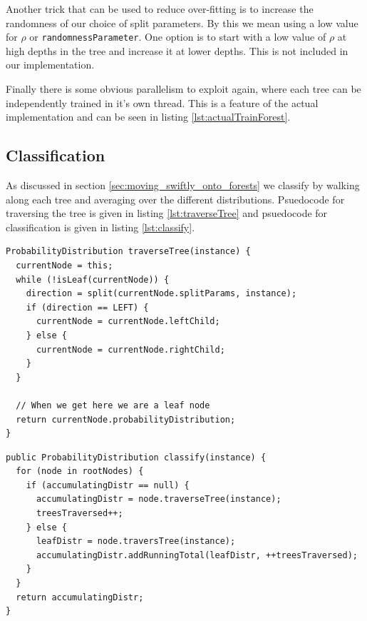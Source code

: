 \documentclass[12pt,twoside,notitlepage]{report}
\begin{document}
          Another trick that can be used to reduce over-fitting is to increase the randomness of our choice of 
          split parameters. By this we mean using a low value for $\rho$ or \texttt{randomnessParameter}. One option 
          is to start with a low value of $\rho$ at high depths in the tree and increase it at lower depths. This is 
          not included in our implementation.

          Finally there is some obvious parallelism to exploit again, where each tree can be independently trained 
          in it's own thread. This is a feature of the actual implementation and can be seen in listing 
          \ref{lst:actualTrainForest}.






      \subsection{Classification} \label{sec:classification}
          As discussed in section \ref{sec:moving_swiftly_onto_forests} we classify by walking along each tree and 
          averaging over the different distributions. Psuedocode for traversing the tree is given in listing 
          \ref{lst:traverseTree} and psuedocode for classification is given in listing \ref{lst:classify}.

          \begin{lstlisting}[float=tp,caption={Psuedocode for traversing a decision tree.}, label={lst:traverseTree}]
ProbabilityDistribution traverseTree(instance) {
  currentNode = this;
  while (!isLeaf(currentNode)) {
    direction = split(currentNode.splitParams, instance);
    if (direction == LEFT) {
      currentNode = currentNode.leftChild;
    } else {
      currentNode = currentNode.rightChild;
    }
  }

  // When we get here we are a leaf node
  return currentNode.probabilityDistribution;
}
          \end{lstlisting}

          \begin{lstlisting}[float=tp,caption={Psuedocode for classification using a decision tree.}, label={lst:classify}]
public ProbabilityDistribution classify(instance) {
  for (node in rootNodes) {
    if (accumulatingDistr == null) {
      accumulatingDistr = node.traverseTree(instance);
      treesTraversed++;
    } else {
      leafDistr = node.traversTree(instance);
      accumulatingDistr.addRunningTotal(leafDistr, ++treesTraversed);
    }
  }
  return accumulatingDistr;
}
          \end{lstlisting}
\end{document}

